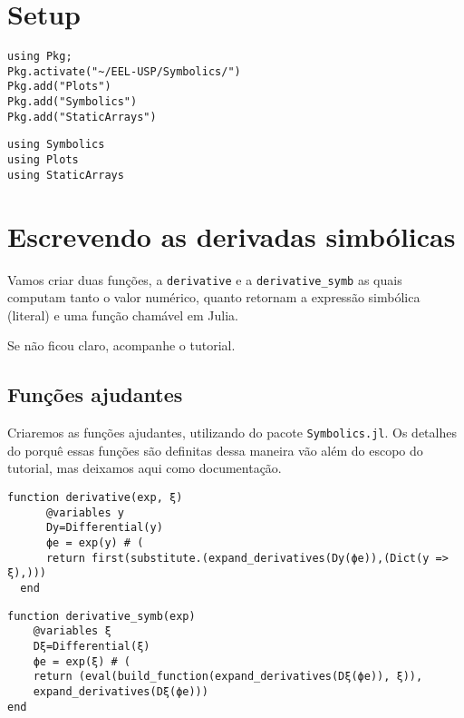 \documentclass[12pt]{article}
\date{\today}
\title{}
\begin{document}
\tableofcontents
\clearpage

\section{Setup}
\label{sec:orgddbcd56}
\begin{verbatim}
using Pkg;
Pkg.activate("~/EEL-USP/Symbolics/")
Pkg.add("Plots")
Pkg.add("Symbolics")
Pkg.add("StaticArrays")
\end{verbatim}

\begin{verbatim}
using Symbolics
using Plots
using StaticArrays
\end{verbatim}

\section{Escrevendo as derivadas \textbf{simbólicas}}
\label{sec:org500faaf}
Vamos criar duas funções, a \texttt{derivative} e a \texttt{derivative\_symb} as quais computam tanto o valor numérico, quanto retornam a expressão simbólica (literal) e uma função chamável em Julia.

Se não ficou claro, acompanhe o tutorial. 

\clearpage
\subsection{Funções ajudantes}
\label{sec:orgbbb7933}
Criaremos as funções ajudantes, utilizando do pacote \texttt{Symbolics.jl}. Os detalhes do porquê essas funções são definitas dessa maneira vão além do escopo do tutorial, mas deixamos aqui como documentação.

\begin{verbatim}
function derivative(exp, ξ)
      @variables y
      Dy=Differential(y)
      ϕe = exp(y) # (
      return first(substitute.(expand_derivatives(Dy(ϕe)),(Dict(y => ξ),)))
  end
\end{verbatim}

\begin{verbatim}
function derivative_symb(exp)
    @variables ξ
    Dξ=Differential(ξ)
    ϕe = exp(ξ) # (
    return (eval(build_function(expand_derivatives(Dξ(ϕe)), ξ)),
    expand_derivatives(Dξ(ϕe)))
end
\end{verbatim}
\end{document}
